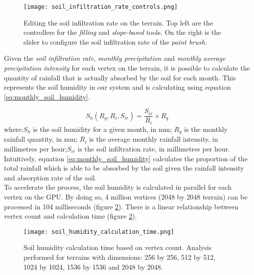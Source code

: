 \begin{figure}
\center
	\texttt{[image: soil\_infiltration\_rate\_controls.png]}
	\caption{ Editing the soil infiltration rate on the terrain. Top left are the controllers for the \textit{filling} and \textit{slope-based} tools. On the right is the slider to configure the soil infiltration rate of the \textit{paint brush}. }
	\label{fig:soil_infiltration_controls}
\end{figure}

Given the \textit{soil infiltration rate}, \textit{monthly precipitation} and \textit{monthly average precipitation intensity} for each vertex on the terrain, it is possible to calculate the quantity of rainfall that is actually absorbed by the soil for each month. This represents the soil humidity in our system and is calculating using equation \ref{eq:monthly_soil_humidity}. 

\begin{equation} \label{eq:monthly_soil_humidity}
	S_{h}(R_{q},R_{i},S_{ir}) = 
	\frac{S_{ir}}{R_{i}} \times R_{q}
\end{equation}
where:\textit{$S_{h}$} is the soil humidity for a given month, in mm; \textit{$R_{q}$} is the monthly rainfall quantity, in mm; \textit{$R_{i}$} is the average monthly rainfall intensity, in millimetres per hour;\textit{$S_{ir}$} is the soil infiltration rate, in millimetres per hour.\\

Intuitively, equation \ref{eq:monthly_soil_humidity} calculates the proportion of the total rainfall which is able to be absorbed by the soil given the rainfall intensity and absorption rate of the soil.\\

To accelerate the process, the soil humidity is calculated in parallel for each vertex on the GPU. By doing so, 4 million vertices (2048 by 2048 terrain) can be processed in 104 milliseconds (figure \ref{fig:soil_humidity_calculation_time}). There is a linear relationship between vertex count and calculation time (figure \ref{fig:soil_humidity_calculation_time}).

\begin{figure}
\center
	\texttt{[image: soil\_humidity\_calculation\_time.png]}
	\caption{ Soil humidity calculation time based on vertex count. Analysis performed for terrains with dimensions: 256 by 256, 512 by 512, 1024 by 1024, 1536 by 1536 and 2048 by 2048. }
	\label{fig:soil_humidity_calculation_time}
\end{figure}


